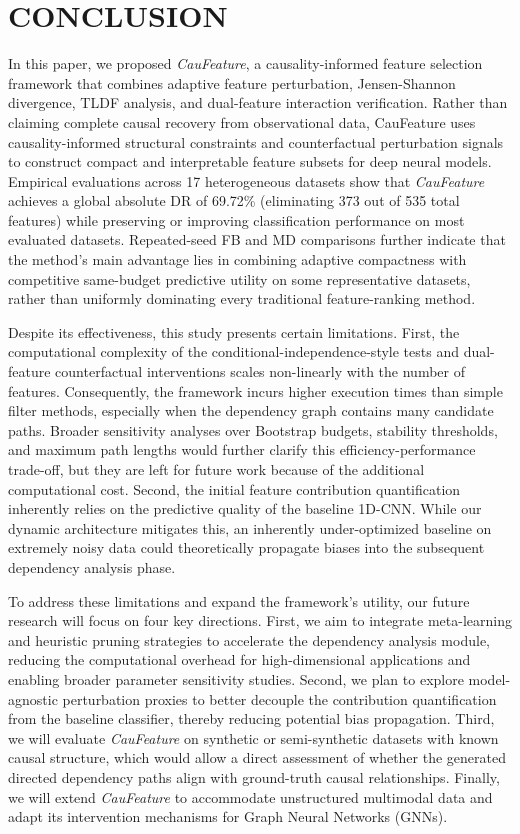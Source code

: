 \documentclass[journal]{IEEEtran}
\begin{document}
\FloatBarrier
\section{CONCLUSION}
\label{Conclusions}

In this paper, we proposed \textit{CauFeature}, a causality-informed feature selection framework that combines adaptive feature perturbation, Jensen-Shannon divergence, TLDF analysis, and dual-feature interaction verification. Rather than claiming complete causal recovery from observational data, CauFeature uses causality-informed structural constraints and counterfactual perturbation signals to construct compact and interpretable feature subsets for deep neural models. Empirical evaluations across 17 heterogeneous datasets show that \textit{CauFeature} achieves a global absolute DR of 69.72\% (eliminating 373 out of 535 total features) while preserving or improving classification performance on most evaluated datasets. Repeated-seed FB and MD comparisons further indicate that the method's main advantage lies in combining adaptive compactness with competitive same-budget predictive utility on some representative datasets, rather than uniformly dominating every traditional feature-ranking method.

Despite its effectiveness, this study presents certain limitations. First, the computational complexity of the conditional-independence-style tests and dual-feature counterfactual interventions scales non-linearly with the number of features. Consequently, the framework incurs higher execution times than simple filter methods, especially when the dependency graph contains many candidate paths. Broader sensitivity analyses over Bootstrap budgets, stability thresholds, and maximum path lengths would further clarify this efficiency-performance trade-off, but they are left for future work because of the additional computational cost. Second, the initial feature contribution quantification inherently relies on the predictive quality of the baseline 1D-CNN. While our dynamic architecture mitigates this, an inherently under-optimized baseline on extremely noisy data could theoretically propagate biases into the subsequent dependency analysis phase. 

To address these limitations and expand the framework's utility, our future research will focus on four key directions. First, we aim to integrate meta-learning and heuristic pruning strategies to accelerate the dependency analysis module, reducing the computational overhead for high-dimensional applications and enabling broader parameter sensitivity studies. Second, we plan to explore model-agnostic perturbation proxies to better decouple the contribution quantification from the baseline classifier, thereby reducing potential bias propagation. Third, we will evaluate \textit{CauFeature} on synthetic or semi-synthetic datasets with known causal structure, which would allow a direct assessment of whether the generated directed dependency paths align with ground-truth causal relationships. Finally, we will extend \textit{CauFeature} to accommodate unstructured multimodal data and adapt its intervention mechanisms for Graph Neural Networks (GNNs).
\end{document}
